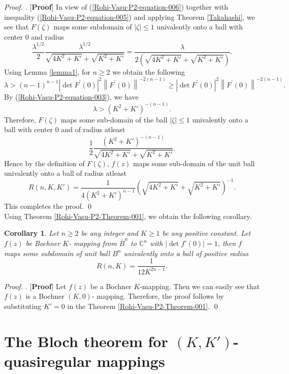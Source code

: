 \documentclass[a4paper,12pt,reqno]{amsart}
\theoremstyle{plain}
\newtheorem{cor}{Corollary}
\theoremstyle{definition}
\newenvironment{pf}[1][]{%
	\vskip 3mm
	\noindent
	\ifthenelse{\equal{#1}{}}%
	{{\slshape Proof. }}%
	{{\slshape #1.} }%
}%
{\qed\bigskip}
\numberwithin{equation}{section}
\begin{document}
\begin{pf} [{\bf Proof}]
In view of (\ref{Rohi-Vasu-P2-equation-006}) together with inequality (\ref{Rohi-Vasu-P2-equation-005}) and applying Theorem \ref{Takahashi}, we see that $F(\zeta)$ maps some subdomain of $|\zeta| \leq 1$ univalently  onto a ball with center $0$ and radius
$$
\frac{\lambda^{1 / 2}}{2} \frac{{\lambda}^{1/2}}{\sqrt{4K^2+K'}+\sqrt{K^2+K'}}=\frac{ \lambda}{2(\sqrt{4K^2+K'}+\sqrt{K^2+K'})}.
$$
Using Lemma \ref{lemma1}, for $n\geq2$ we obtain the following
$$
\lambda >(n-1)^{n-1} \left|\operatorname{det} F^{\prime}(0)\right|^2\left\|F^{\prime}(0)\right\|^{-2(n-1)}\geq   \left|\operatorname{det} F^{\prime}(0)\right|^2\left\|F^{\prime}(0)\right\|^{-2(n-1)}.
$$
By (\ref{Rohi-Vasu-P2-equation-003}), we have 
$$\lambda>(K^2+K')^{-(n-1)}.
$$
Therefore, $F(\zeta)$ maps some sub-domain of the ball $|\zeta|\leq1$ univalently onto a ball with center $0$ and  of radius atleast
$$
\frac{1}{2}\frac{(K^2+K')^{-(n-1)}}{\sqrt{4K^2+K'}+\sqrt{K^2+K'}} .
$$
Hence by the definition of $F(\zeta)$, $f(z)$ maps some sub-domain of the unit ball univalently onto a ball of radius atleast
$$R(n,K,K')=\frac{1}{4(K^2+K')^{n-1}}\left(\sqrt{4K^2+K'}+\sqrt{K^2+K'}\right)^{-1}.$$
This completes the proof.
\end{pf}\\
Using Theorem \ref{Rohi-Vasu-P2-Theorem-001}, we obtain the following corollary.
\begin{cor}\label{Rohi-Vasu-P2-Corollary-001}
 Let $n \geq 2$ be any integer and $K \geq 1$ be any positive constant. Let
$ f(z)$ be Bochner $K$- mapping from $\overline{B}^n$ to $\mathbb{C}^n$ with $|\operatorname{det} f'(0)|=1$, then $f$ maps some subdomain of unit ball $B^n$ univalently onto a ball of positive radius $$R(n,K)=\frac{1}{12K^{2n-1}}.$$
\end{cor}
\begin{pf} [{\bf Proof}]
Let $f(z)$ be a Bochner $K$-mapping. Then we can easily see that $f(z)$ is a Bochner $(K,0)$- mapping. Therefore, the proof follows by substituting $K'=0$ in the Theorem \ref{Rohi-Vasu-P2-Theorem-001}.
\end{pf}
\vspace{2mm}

\section{The Bloch theorem for $(K,K')$-quasiregular mappings}
\end{document}
